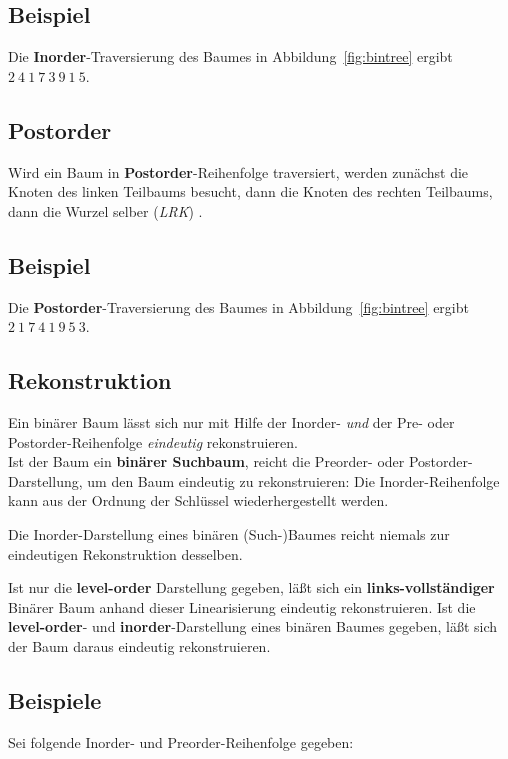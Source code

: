 \subsection*{Beispiel}
Die \textbf{Inorder}-Traversierung des Baumes in Abbildung~\ref{fig:bintree} ergibt $2\ 4\ 1\ 7\ 3\ 9\ 1\ 5$.


\subsection{Postorder}
Wird ein Baum in \textbf{Postorder}-Reihenfolge traversiert, werden zunächst die Knoten des linken Teilbaums besucht, dann die Knoten des rechten Teilbaums, dann die Wurzel selber (\textit{LRK}) .

\subsection*{Beispiel}
Die \textbf{Postorder}-Traversierung des Baumes in Abbildung~\ref{fig:bintree} ergibt $2\ 1\ 7\ 4\ 1\ 9\ 5\ 3$.

\subsection{Rekonstruktion}
Ein binärer Baum lässt sich nur mit Hilfe der Inorder- \textit{und} der Pre- oder Postorder-Reihenfolge \textit{eindeutig} rekonstruieren.\\

\noindent
Ist der Baum ein \textbf{binärer Suchbaum}, reicht die Preorder- oder Postorder-Darstellung, um den Baum eindeutig zu rekonstruieren: Die Inorder-Reihenfolge kann aus der Ordnung der Schlüssel wiederhergestellt werden.

\noindent
Die Inorder-Darstellung eines binären (Such-)Baumes reicht niemals zur eindeutigen Rekonstruktion desselben.

\noindent
Ist nur die \textbf{level-order} Darstellung gegeben, läßt sich ein \textbf{links-vollständiger} Binärer Baum anhand dieser Linearisierung eindeutig rekonstruieren.
Ist die \textbf{level-order}- und \textbf{inorder}-Darstellung eines binären Baumes gegeben, läßt sich der Baum daraus eindeutig rekonstruieren.


\subsection*{Beispiele}
Sei folgende Inorder- und Preorder-Reihenfolge gegeben:\\


